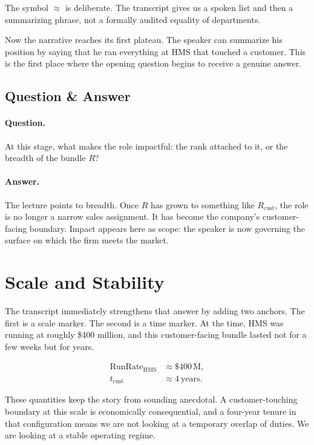 \begin{remark}
The symbol \(\approx\) is deliberate. The transcript gives us a spoken list and then a summarizing phrase, not a formally audited equality of departments.
\end{remark}

Now the narrative reaches its first plateau. The speaker can summarize his position by saying that he ran everything at HMS that touched a customer. This is the first place where the opening question begins to receive a genuine answer.

\subsection{Question \& Answer}

\paragraph{Question.}
At this stage, what makes the role impactful: the rank attached to it, or the breadth of the bundle \(R\)?

\paragraph{Answer.}
The lecture points to breadth. Once \(R\) has grown to something like \(R_{\mathrm{cust}}\), the role is no longer a narrow sales assignment. It has become the company's customer-facing boundary. Impact appears here as scope: the speaker is now governing the surface on which the firm meets the market.

\section{Scale and Stability}

The transcript immediately strengthens that answer by adding two anchors. The first is a scale marker. The second is a time marker. At the time, HMS was running at roughly \$400 million, and this customer-facing bundle lasted not for a few weeks but for years.

\begin{align}
\mathrm{RunRate}_{\mathrm{HMS}} &\approx \$400\,\mathrm{M},\\
t_{\mathrm{cust}} &\approx 4\ \text{years}.
\end{align}

These quantities keep the story from sounding anecdotal. A customer-touching boundary at this scale is economically consequential, and a four-year tenure in that configuration means we are not looking at a temporary overlap of duties. We are looking at a stable operating regime.

